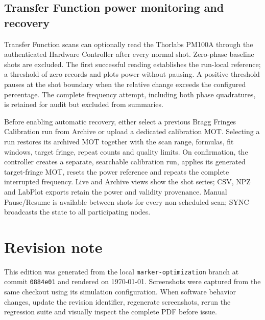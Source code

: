 \documentclass[11pt,oneside,openany]{book}
\newcommand{\branchname}{\texttt{marker-optimization}}
\newcommand{\commitid}{\texttt{0884e01}}
\begin{document}
\section{Transfer Function power monitoring and recovery}
Transfer Function scans can optionally read the Thorlabs PM100A through the authenticated
Hardware Controller after every normal shot. Zero-phase baseline shots are excluded. The
first successful reading establishes the run-local reference; a threshold of zero records
and plots power without pausing. A positive threshold pauses at the shot boundary when the
relative change exceeds the configured percentage. The complete frequency attempt,
including both phase quadratures, is retained for audit but excluded from summaries.

Before enabling automatic recovery, either select a previous Bragg Fringes Calibration run
from Archive or upload a dedicated calibration MOT. Selecting a run restores its archived
MOT together with the scan range, formulas, fit windows, target fringe, repeat counts and
quality limits. On confirmation, the controller creates a separate,
searchable calibration run, applies its generated target-fringe MOT, resets the power
reference and repeats the complete interrupted frequency. Live and Archive views show the
shot series; CSV, NPZ and LabPlot exports retain the power and validity provenance. Manual
Pause/Resume is available between shots for every non-scheduled scan; SYNC broadcasts the
state to all participating nodes.

\backmatter
\chapter*{Revision note}
This edition was generated from the local \branchname{} branch at commit \commitid{} and
rendered on \today. Screenshots were captured from the same checkout using its simulation
configuration. When software behavior changes, update the revision identifier, regenerate
screenshots, rerun the regression suite and visually inspect the complete PDF before issue.
\end{document}
